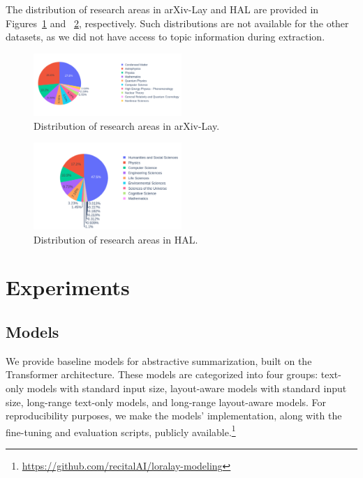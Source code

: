 The distribution of research areas in arXiv-Lay and HAL are provided in Figures~\ref{fig:chapter5-arxiv-research-areas} and ~\ref{fig:chapter5-hal-research-areas}, respectively. Such distributions are not available for the other datasets, as we did not have access to topic information during extraction.

\begin{figure}[H]
    \includegraphics[width=0.5\textwidth]{images/chapter5/distribution_research_areas_arxiv.pdf}
  \caption{Distribution of research areas in arXiv-Lay.}
  \label{fig:chapter5-arxiv-research-areas}
\end{figure}

\begin{figure}[H]
    \includegraphics[width=0.5\textwidth]{images/chapter5/distribution_research_areas_hal.pdf}
  \caption{Distribution of research areas in HAL.}
  \label{fig:chapter5-hal-research-areas}
\end{figure}


\section{Experiments}

\subsection{Models}

We provide baseline models for abstractive summarization, built on the Transformer architecture. These models are categorized into four groups: text-only models with standard input size, layout-aware models with standard input size, long-range text-only models, and long-range layout-aware models. For reproducibility purposes, we make the models' implementation, along with the fine-tuning and evaluation scripts, publicly available.\footnote{\url{https://github.com/recitalAI/loralay-modeling}}

